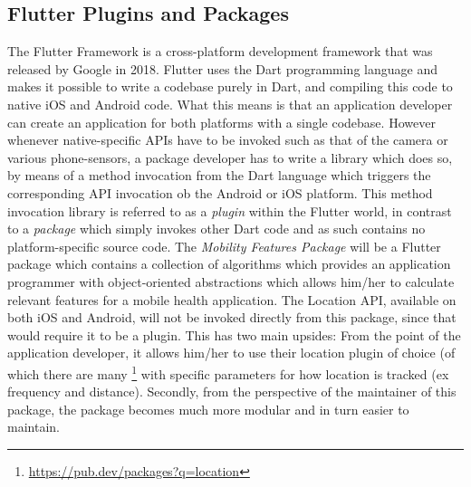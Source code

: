 \subsection{Flutter Plugins and Packages}
The Flutter Framework is a cross-platform development framework that was released by Google in 2018. Flutter uses the Dart programming language and makes it possible to write a codebase purely in Dart, and compiling this code to native iOS and Android code. What this means is that an application developer can create an application for both platforms with a single codebase. However whenever native-specific APIs have to be invoked such as that of the camera or various phone-sensors, a package developer has to write a library which does so, by means of a method invocation from the Dart language which triggers the corresponding API invocation ob the Android or iOS platform. This method invocation library is referred to as a \textit{plugin} within the Flutter world, in contrast to a \textit{package} which simply invokes other Dart code and as such contains no platform-specific source code. The \textit{Mobility Features Package} will be a Flutter package which contains a collection of algorithms which provides an application programmer with object-oriented abstractions which allows him/her to calculate relevant features for a mobile health application. The Location API, available on both iOS and Android, will not be invoked directly from this package, since that would require it to be a plugin. This has two main upsides: From the point of the application developer, it allows him/her to use their location plugin of choice (of which there are many \footnote{\url{https://pub.dev/packages?q=location}} with specific parameters for how location is tracked (ex frequency and distance). Secondly, from the perspective of the maintainer of this package, the package becomes much more modular and in turn easier to maintain.